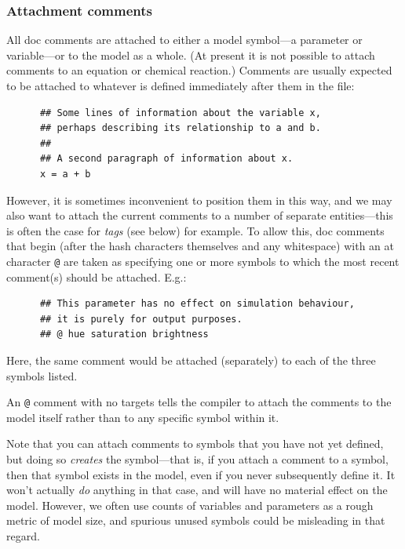 \documentclass[a4paper,11pt]{article}
\begin{document}
\subsubsection*{Attachment comments}
All doc comments are attached to either a model symbol---a parameter or variable---or to the model as a whole. (At present it is not possible to attach comments to an equation or chemical reaction.) Comments are usually expected to be attached to whatever is defined immediately after them in the file:
\begin{verbatim}
      ## Some lines of information about the variable x,
      ## perhaps describing its relationship to a and b.
      ##
      ## A second paragraph of information about x.
      x = a + b
\end{verbatim}
However, it is sometimes inconvenient to position them in this way, and we may also want to attach the current comments to a number of separate entities---this is often the case for \textit{tags} (see below) for example. To allow this, doc comments that begin (after the hash characters themselves and any whitespace) with an at character \texttt{@} are taken as specifying one or more symbols to which the most recent comment(s) should be attached. E.g.:
\begin{verbatim}
      ## This parameter has no effect on simulation behaviour,
      ## it is purely for output purposes.
      ## @ hue saturation brightness
\end{verbatim}
Here, the same comment would be attached (separately) to each of the three symbols listed.

An \texttt{@} comment with no targets tells the compiler to attach the comments to the model itself rather than to any specific symbol within it.

Note that you can attach comments to symbols that you have not yet defined, but doing so \textit{creates} the symbol---that is, if you attach a comment to a symbol, then that symbol exists in the model, even if you never subsequently define it. It won't actually \textit{do} anything in that case, and will have no material effect on the model. However, we often use counts of variables and parameters as a rough metric of model size, and spurious unused symbols could be misleading in that regard.
\end{document}

